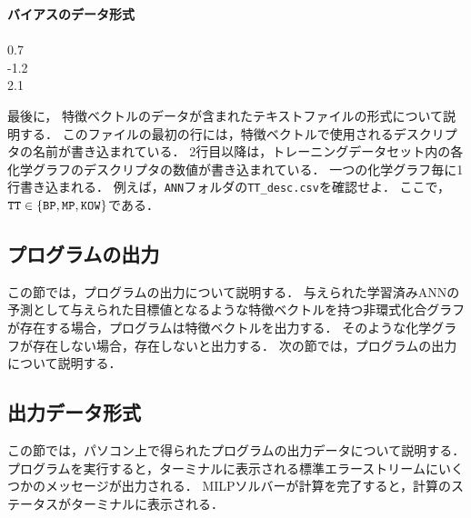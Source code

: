 \documentclass[11pt, titlepage, dvipdfmx, twoside]{jarticle}
\newcommand{\target}{目標}
\begin{document}
\bigskip

\begin{oframed}
{\bf バイアスのデータ形式}\\\\
0.7\\
-1.2\\
2.1\\
\end{oframed}

\bigskip

最後に， 特徴ベクトルのデータが含まれたテキストファイルの形式について説明する．
このファイルの最初の行には，特徴ベクトルで使用されるデスクリプタの名前が書き込まれている．
2行目以降は，トレーニングデータセット内の各化学グラフのデスクリプタの数値が書き込まれている．
一つの化学グラフ毎に1行書き込まれる．
例えば，{\tt ANN}フォルダの{\tt TT\_desc.csv}を確認せよ．
ここで，${\tt TT}\in \{{\tt BP, MP, KOW}\}$である．



\subsection{プログラムの出力}
\label{sec:section3_3}

この節では，プログラムの出力について説明する．
与えられた学習済みANNの予測として与えられた\target 値となるような特徴ベクトルを持つ非環式化合グラフが存在する場合，プログラムは特徴ベクトルを出力する．
そのような化学グラフが存在しない場合，存在しないと出力する．
次の節では，プログラムの出力について説明する．


\subsection{出力データ形式}
\label{sec:section3_4}

この節では，パソコン上で得られたプログラムの出力データについて説明する．
プログラムを実行すると，ターミナルに表示される標準エラーストリームにいくつかのメッセージが出力される．
MILPソルバーが計算を完了すると，計算のステータスがターミナルに表示される．

\bigskip
\end{document}
